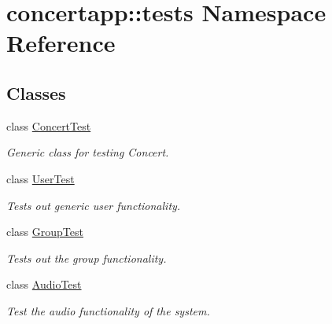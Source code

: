 \hypertarget{namespaceconcertapp_1_1tests}{
\section{concertapp::tests Namespace Reference}
\label{namespaceconcertapp_1_1tests}
}
\subsection*{Classes}
\begin{DoxyCompactItemize}
\item 
class \hyperlink{classconcertapp_1_1tests_1_1_concert_test}{ConcertTest}
\begin{DoxyCompactList}\small\item\em Generic class for testing Concert. \item\end{DoxyCompactList}\item 
class \hyperlink{classconcertapp_1_1tests_1_1_user_test}{UserTest}
\begin{DoxyCompactList}\small\item\em Tests out generic user functionality. \item\end{DoxyCompactList}\item 
class \hyperlink{classconcertapp_1_1tests_1_1_group_test}{GroupTest}
\begin{DoxyCompactList}\small\item\em Tests out the group functionality. \item\end{DoxyCompactList}\item 
class \hyperlink{classconcertapp_1_1tests_1_1_audio_test}{AudioTest}
\begin{DoxyCompactList}\small\item\em Test the audio functionality of the system. \item\end{DoxyCompactList}\end{DoxyCompactItemize}
